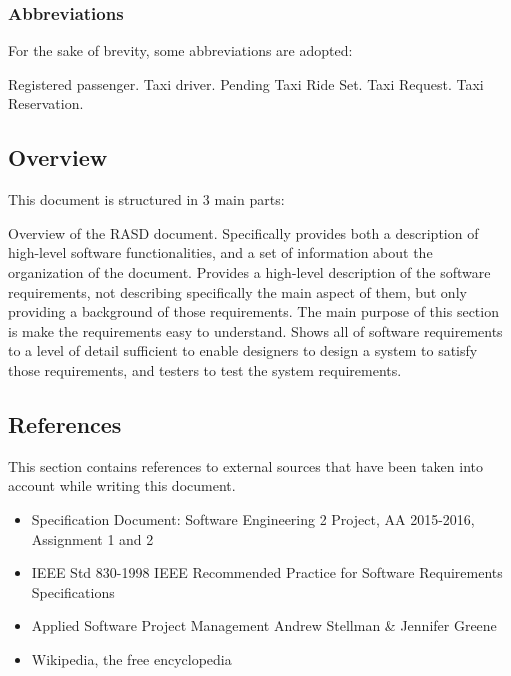 \subsubsection{Abbreviations}
For the sake of brevity, some abbreviations are adopted:
\begin{itemize}
	 Registered passenger.
	 Taxi driver.
	 Pending Taxi Ride Set.
	 Taxi Request.
	 Taxi Reservation.
\end{itemize}

\subsection{Overview}
This document is structured in 3 main parts:
\begin{itemize}
	 Overview of the RASD document. Specifically provides both a description of high-level software functionalities, and a set of information about the organization of the document.
	 Provides a high-level description of the software requirements, not describing specifically the main aspect of them, but only providing a background of those requirements. The main purpose of this section is make the requirements easy to understand.
	 Shows all of software requirements to a level of detail sufficient to enable designers to design a system to satisfy those requirements, and testers to test the system requirements.
\end{itemize}

\subsection{References}
This section contains references to external sources that have been taken into account while writing this document.
\begin{itemize}
	\item Specification Document: Software Engineering 2 Project, AA 2015-2016, Assignment 1 and 2
	\item IEEE Std 830-1998 IEEE Recommended Practice for Software Requirements Specifications
	\item Applied Software Project Management Andrew Stellman \& Jennifer Greene
	\item Wikipedia, the free encyclopedia
\end{itemize}